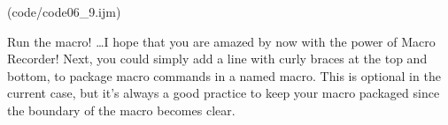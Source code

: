 (code/code06_9.ijm)

Run the macro! \ldots I hope that you are amazed by now with the power of Macro
Recorder! Next, you could simply add a line with curly braces at the top and bottom, to package macro commands in a named macro. This is optional in the current case, but it's always a good practice to keep your macro packaged since the boundary of the macro becomes clear.